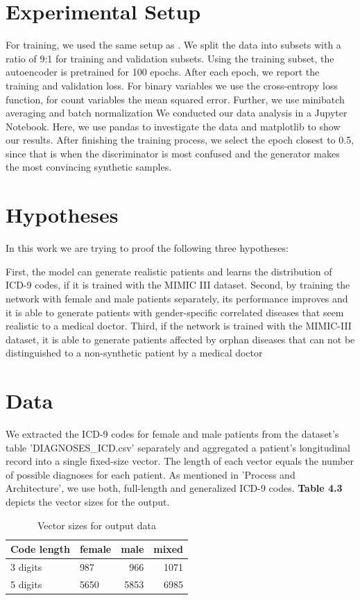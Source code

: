 \documentclass[11pt, a4paper, oneside]{book}
\begin{document}
\section{Experimental Setup}
 For training, we used the same setup as \citep{Choi2017}. We split the data into subsets with a ratio of 9:1 for training and validation subsets. Using the training subset, the autoencoder is pretrained for 100 epochs. 
 After each epoch, we report the training and validation loss. For binary variables we use the cross-entropy loss  function, for count variables the mean squared error.
 Further, we use minibatch averaging and batch normalization
We conducted our data analysis in a Jupyter Notebook. Here, we use pandas to investigate the data and matplotlib to show our results.
After finishing the training process, we select the epoch closest to 0.5, since that is when the discriminator is most confused and the generator makes the most convincing synthetic samples.


\section{Hypotheses}
In this work we are trying to proof the following three hypotheses:

First, the model can generate realistic patients and learns the distribution of ICD-9 codes, if it is trained with the MIMIC III dataset.
Second, by training the network with female and male patients separately, its performance improves and it is able to generate patients with gender-specific correlated diseases that seem realistic to a medical doctor.
Third, if the network is trained with the MIMIC-III dataset, it is able to generate patients affected by orphan diseases that can not be distinguished to a non-synthetic patient by a medical doctor

\section{Data}
We extracted the ICD-9 codes for female and male patients from the dataset's table 'DIAGNOSES\_ICD.csv' separately and aggregated a patient’s longitudinal record into a single fixed-size vector. The length of each vector equals the number of possible diagnoses for each patient. As mentioned in 'Process and Architecture', we use both, full-length and generalized ICD-9 codes. \textbf{Table 4.3} depicts the vector sizes for the output.


\begin{table}
\begin{tabularx}{\textwidth}{X|l|r|r}
Code length & female & male & mixed\\
\hline
3 digits  & 987 & 966 & 1071\\
5 digits & 5650 & 5853 & 6985\\
\end{tabularx}
\caption{Vector sizes for output data}
\end{table}
\end{document}
